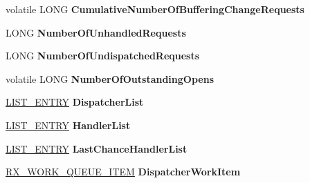 \begin{DoxyCompactItemize}
volatile L\+O\+NG {\bfseries Cumulative\+Number\+Of\+Buffering\+Change\+Requests}
\item 
\mbox{\label{struct___r_x___b_u_f_f_e_r_i_n_g___m_a_n_a_g_e_r___a0734db01a1c42436abda3da7606bb9b3}} 
L\+O\+NG {\bfseries Number\+Of\+Unhandled\+Requests}
\item 
\mbox{\label{struct___r_x___b_u_f_f_e_r_i_n_g___m_a_n_a_g_e_r___a38a79cc59f84bca6fa39d0fe880c5bde}} 
L\+O\+NG {\bfseries Number\+Of\+Undispatched\+Requests}
\item 
\mbox{\label{struct___r_x___b_u_f_f_e_r_i_n_g___m_a_n_a_g_e_r___ad070eba81faf31c16879e2297d7e3f6e}} 
volatile L\+O\+NG {\bfseries Number\+Of\+Outstanding\+Opens}
\item 
\mbox{\label{struct___r_x___b_u_f_f_e_r_i_n_g___m_a_n_a_g_e_r___aa9641ef548123efaebd4185c992826b8}} 
\hyperlink{struct___l_i_s_t___e_n_t_r_y}{L\+I\+S\+T\+\_\+\+E\+N\+T\+RY} {\bfseries Dispatcher\+List}
\item 
\mbox{\label{struct___r_x___b_u_f_f_e_r_i_n_g___m_a_n_a_g_e_r___ac99d9861f87675f0c61a60d3df3622c8}} 
\hyperlink{struct___l_i_s_t___e_n_t_r_y}{L\+I\+S\+T\+\_\+\+E\+N\+T\+RY} {\bfseries Handler\+List}
\item 
\mbox{\label{struct___r_x___b_u_f_f_e_r_i_n_g___m_a_n_a_g_e_r___aa045dbc1606b4e34b8fd4369b751dc09}} 
\hyperlink{struct___l_i_s_t___e_n_t_r_y}{L\+I\+S\+T\+\_\+\+E\+N\+T\+RY} {\bfseries Last\+Chance\+Handler\+List}
\item 
\mbox{\label{struct___r_x___b_u_f_f_e_r_i_n_g___m_a_n_a_g_e_r___a93a9933536530a5b36eef949ebf9fb10}} 
\hyperlink{struct___r_x___w_o_r_k___q_u_e_u_e___i_t_e_m__}{R\+X\+\_\+\+W\+O\+R\+K\+\_\+\+Q\+U\+E\+U\+E\+\_\+\+I\+T\+EM} {\bfseries Dispatcher\+Work\+Item}
\item 
\mbox{\label{struct___r_x___b_u_f_f_e_r_i_n_g___m_a_n_a_g_e_r___af34a518223714cd3e96f22b969892ecb}} 

\end{DoxyCompactItemize}
